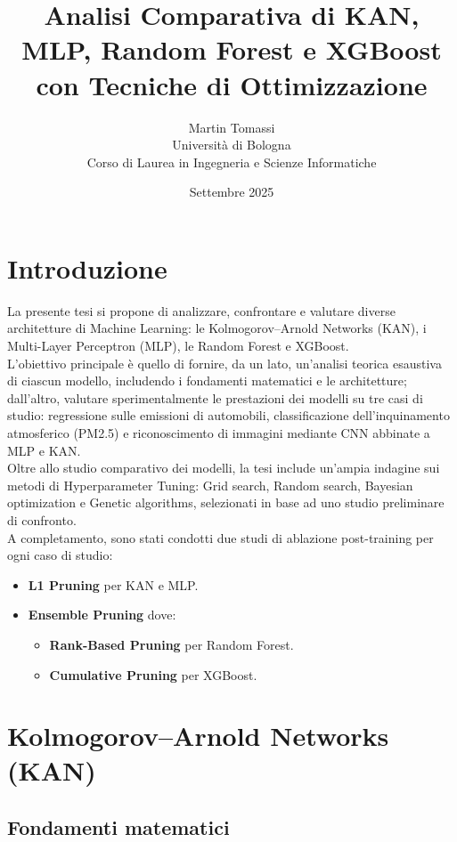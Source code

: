 \documentclass[a4paper,12pt]{report}
\title{Analisi Comparativa di KAN, MLP, Random Forest e XGBoost con Tecniche di Ottimizzazione}
\author{Martin Tomassi \\ Università di Bologna \\ Corso di Laurea in Ingegneria e Scienze Informatiche}
\date{Settembre 2025}
\begin{document}
	
	\maketitle
	
	\tableofcontents
	
	\chapter{Introduzione}
	La presente tesi si propone di analizzare, confrontare e valutare diverse architetture di Machine Learning: le Kolmogorov–Arnold Networks (KAN), i Multi-Layer Perceptron (MLP), le Random Forest e XGBoost. \\
	L’obiettivo principale è quello di fornire, da un lato, un’analisi teorica esaustiva di ciascun modello, includendo i fondamenti matematici e le architetture; dall’altro, valutare sperimentalmente le prestazioni dei modelli su tre casi di studio: regressione sulle emissioni di automobili, classificazione dell’inquinamento atmosferico (PM2.5) e riconoscimento di immagini mediante CNN abbinate a MLP e KAN. \\
	Oltre allo studio comparativo dei modelli, la tesi include un’ampia indagine sui metodi di Hyperparameter Tuning: Grid search, Random search, Bayesian optimization e Genetic algorithms, selezionati in base ad uno studio preliminare di confronto. \\
	A completamento, sono stati condotti due studi di ablazione post-training per ogni caso di studio:
	\begin{itemize}
		\item \textbf{L1 Pruning} per KAN e MLP.
		\item \textbf{Ensemble Pruning} dove:
		\begin{itemize}
			\item \textbf{Rank-Based Pruning} per Random Forest.
			\item \textbf{Cumulative Pruning} per XGBoost.
		\end{itemize}
	\end{itemize}
	
	\chapter{Kolmogorov--Arnold Networks (KAN)}
	
	\section{Fondamenti matematici}
	
\end{document}
